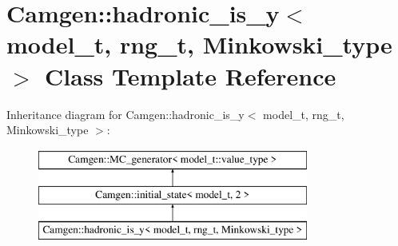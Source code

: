 \hypertarget{a00259}{\section{Camgen\-:\-:hadronic\-\_\-is\-\_\-y$<$ model\-\_\-t, rng\-\_\-t, Minkowski\-\_\-type $>$ Class Template Reference}
\label{a00259}
}
Inheritance diagram for Camgen\-:\-:hadronic\-\_\-is\-\_\-y$<$ model\-\_\-t, rng\-\_\-t, Minkowski\-\_\-type $>$\-:\begin{figure}[H]
\begin{center}
\leavevmode
\includegraphics[height=3.000000cm]{a00259}
\end{center}
\end{figure}
